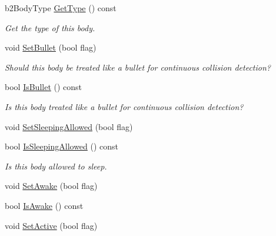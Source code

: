 \begin{DoxyCompactItemize}
\mbox{\label{classb2_body_a9c2234b5a5fff91305a65ecd0cf0ee59}} 
b2\+Body\+Type \hyperlink{classb2_body_a9c2234b5a5fff91305a65ecd0cf0ee59}{Get\+Type} () const
\begin{DoxyCompactList}\small\item\em Get the type of this body. \end{DoxyCompactList}\item 
\mbox{\label{classb2_body_a3253af3725b8d6d63d8223bcd2ddab5c}} 
void \hyperlink{classb2_body_a3253af3725b8d6d63d8223bcd2ddab5c}{Set\+Bullet} (bool flag)
\begin{DoxyCompactList}\small\item\em Should this body be treated like a bullet for continuous collision detection? \end{DoxyCompactList}\item 
\mbox{\label{classb2_body_ad99db1c7a19e8de333ff7f65b0b953f4}} 
bool \hyperlink{classb2_body_ad99db1c7a19e8de333ff7f65b0b953f4}{Is\+Bullet} () const
\begin{DoxyCompactList}\small\item\em Is this body treated like a bullet for continuous collision detection? \end{DoxyCompactList}\item 
void \hyperlink{classb2_body_a229a6de228416203fecbf7a7544c33bb}{Set\+Sleeping\+Allowed} (bool flag)
\item 
\mbox{\label{classb2_body_ac47251de3a8c0ccff620be7bd5ae696a}} 
bool \hyperlink{classb2_body_ac47251de3a8c0ccff620be7bd5ae696a}{Is\+Sleeping\+Allowed} () const
\begin{DoxyCompactList}\small\item\em Is this body allowed to sleep. \end{DoxyCompactList}\item 
void \hyperlink{classb2_body_ac72ed3df52a26c33db82252ab57399af}{Set\+Awake} (bool flag)
\item 
bool \hyperlink{classb2_body_a697f708427cdf7d31a626e80e694682c}{Is\+Awake} () const
\item 
void \hyperlink{classb2_body_ab8059b7b3e3b64aee17b54f68f7dde80}{Set\+Active} (bool flag)
\item 
\mbox{\label{classb2_body_a825f37f457d3674ace96e2b8a9b4cae6}} 

\end{DoxyCompactItemize}
